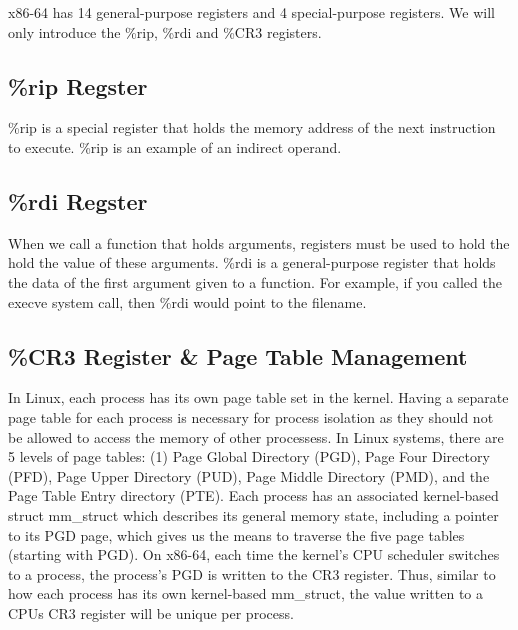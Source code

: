 \documentclass{report}
\begin{document}
\begin{spacing}{1.5}
{\large
x86-64 has 14 general-purpose registers and 4 special-purpose registers. We will only introduce the \%rip, \%rdi and \%CR3 registers.
\newline
}

\subsection{\%rip Regster}

{\large
\%rip is a special register that holds the memory address of the next instruction to execute. \%rip is an example of an indirect operand.
\newline
}


\subsection{\%rdi Regster}

{\large
When we call a function that holds arguments, registers must be used to hold the hold the value of these arguments. \%rdi is a general-purpose register that holds the data of the first argument given to a function. For example, if you called the execve system call, then \%rdi would point to the filename.
\newline
}


\subsection{\%CR3 Register \& Page Table Management}

{\large
In Linux, each process has its own page table set in the kernel. Having a separate page table for each process is necessary for process isolation as they should not be allowed to access the memory of other processess. In Linux systems, there are 5 levels of page tables: (1) Page Global Directory (PGD), Page Four Directory (PFD), Page Upper Directory (PUD), Page Middle Directory (PMD), and the Page Table Entry directory (PTE). Each process has an associated kernel-based struct mm\_struct which describes its general memory state, including a pointer to its PGD page, which gives us the means to traverse the five page tables (starting with PGD). On x86-64, each time the kernel's CPU scheduler switches to a process, the process's PGD is written to the CR3 register. Thus, similar to how each process has its own kernel-based mm\_struct, the value written to a CPUs CR3 register will be unique per process.
\newline
}



\end{spacing}
\end{document}
